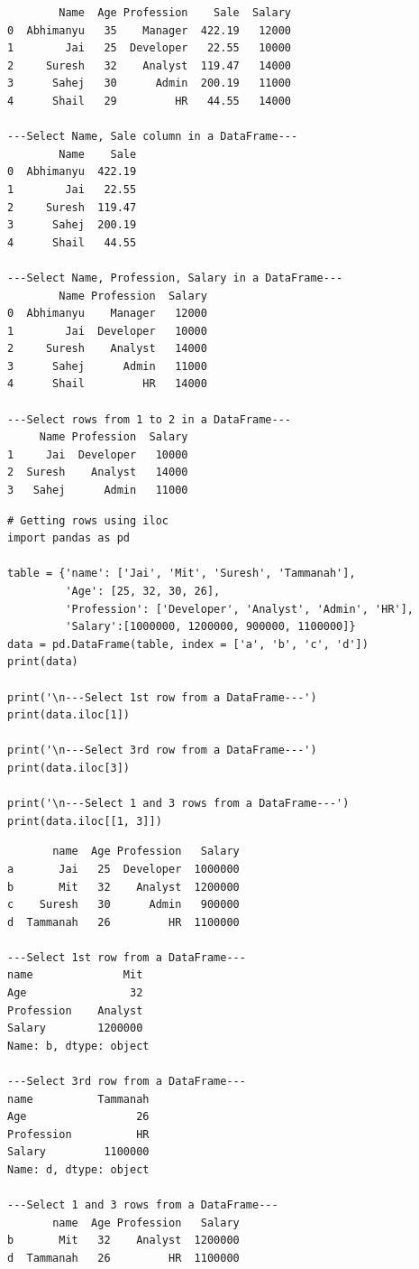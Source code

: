 \documentclass[11pt]{article}
\begin{document}
\begin{verbatim}
        Name  Age Profession    Sale  Salary
0  Abhimanyu   35    Manager  422.19   12000
1        Jai   25  Developer   22.55   10000
2     Suresh   32    Analyst  119.47   14000
3      Sahej   30      Admin  200.19   11000
4      Shail   29         HR   44.55   14000

---Select Name, Sale column in a DataFrame---
        Name    Sale
0  Abhimanyu  422.19
1        Jai   22.55
2     Suresh  119.47
3      Sahej  200.19
4      Shail   44.55

---Select Name, Profession, Salary in a DataFrame---
        Name Profession  Salary
0  Abhimanyu    Manager   12000
1        Jai  Developer   10000
2     Suresh    Analyst   14000
3      Sahej      Admin   11000
4      Shail         HR   14000

---Select rows from 1 to 2 in a DataFrame---
     Name Profession  Salary
1     Jai  Developer   10000
2  Suresh    Analyst   14000
3   Sahej      Admin   11000
\end{verbatim}

\begin{verbatim}
# Getting rows using iloc
import pandas as pd

table = {'name': ['Jai', 'Mit', 'Suresh', 'Tammanah'],
         'Age': [25, 32, 30, 26],
         'Profession': ['Developer', 'Analyst', 'Admin', 'HR'],
         'Salary':[1000000, 1200000, 900000, 1100000]}
data = pd.DataFrame(table, index = ['a', 'b', 'c', 'd'])
print(data)

print('\n---Select 1st row from a DataFrame---')
print(data.iloc[1])

print('\n---Select 3rd row from a DataFrame---')
print(data.iloc[3])

print('\n---Select 1 and 3 rows from a DataFrame---')
print(data.iloc[[1, 3]])
\end{verbatim}

\begin{verbatim}
       name  Age Profession   Salary
a       Jai   25  Developer  1000000
b       Mit   32    Analyst  1200000
c    Suresh   30      Admin   900000
d  Tammanah   26         HR  1100000

---Select 1st row from a DataFrame---
name              Mit
Age                32
Profession    Analyst
Salary        1200000
Name: b, dtype: object

---Select 3rd row from a DataFrame---
name          Tammanah
Age                 26
Profession          HR
Salary         1100000
Name: d, dtype: object

---Select 1 and 3 rows from a DataFrame---
       name  Age Profession   Salary
b       Mit   32    Analyst  1200000
d  Tammanah   26         HR  1100000
\end{verbatim}
\end{document}
